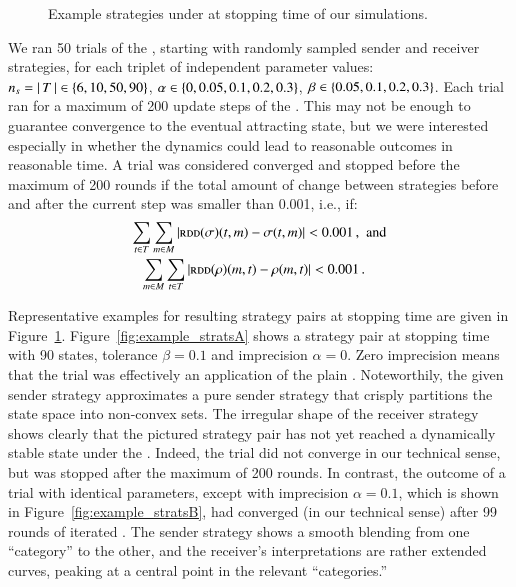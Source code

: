\documentclass[fleqn,reqno,10pt]{article}
\newcommand{\rd}{\acro{rd}} %
\newcommand{\rdd}{\acro{rdd}} %
\newcommand{\impairment}{\ensuremath{\alpha}} %
\newcommand{\toler}{\ensuremath{\beta}} %
\newcommand{\ns}{\ensuremath{n_s}} %
\begin{document}
\begin{figure}


  \caption{Example strategies under \rdd at stopping time of our simulations.}
  \label{fig:example_strats}
\end{figure}

We ran 50 trials of the \rdd, starting with randomly sampled sender
and receiver strategies, for each triplet of independent parameter
values: $\ns = \card{T} \in \set{6, 10, 50, 90}$, $\impairment \in
\set{0, 0.05, 0.1, 0.2, 0.3}$, $\toler \in \set{0.05, 0.1, 0.2,
  0.3}$. Each trial ran for a maximum of 200 update steps of the
\rdd. This may not be enough to guarantee convergence to the eventual
attracting state, but we were interested especially in whether the
dynamics could lead to reasonable outcomes in reasonable time. A trial
was considered converged and stopped before the maximum of 200 rounds
if the total amount of change between strategies before and after the
current \rdd step was smaller than 0.001, i.e., if:
\begin{align*}
  \sum_{\state \in \States} \sum_{\messg \in \Messgs} \left|
    \rdd(\Sstrat)(\state,\messg) - \Sstrat(\state,\messg) \right| <
  0.001\,, & \text{\ \ and} \\
  \sum_{\messg \in \Messgs} \sum_{\state \in \States} \left|
    \rdd(\Rstrat)(\messg,\state) - \Rstrat(\messg,\state) \right| <
  0.001 & \,.
\end{align*}

Representative examples for resulting strategy pairs at stopping time
are given in
Figure~\ref{fig:example_strats}. Figure~\ref{fig:example_stratsA}
shows a strategy pair at stopping time with 90 states, tolerance
$\toler = 0.1$ and imprecision $\impairment = 0$. Zero imprecision
means that the trial was effectively an application of the plain
\rd. Noteworthily, the given sender strategy approximates a pure
sender strategy that crisply partitions the state space into
non-convex sets. The irregular shape of the receiver strategy shows
clearly that the pictured strategy pair has not yet reached a
dynamically stable state under the \rd. Indeed, the trial did not
converge in our technical sense, but was stopped after the maximum of
200 rounds. In contrast, the outcome of a trial with identical
parameters, except with imprecision $\impairment = 0.1$, which is
shown in Figure~\ref{fig:example_stratsB}, had converged (in our
technical sense) after 99 rounds of iterated \rdd. The sender strategy
shows a smooth blending from one ``category'' to the other, and the
receiver's interpretations are rather extended curves, peaking at a
central point in the relevant ``categories.'' 
\end{document}

